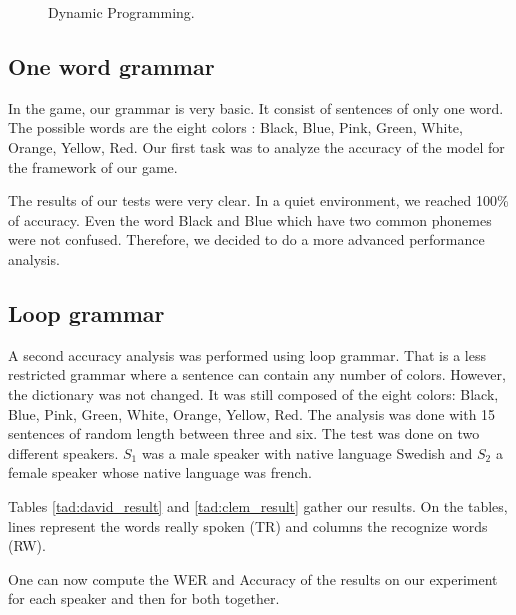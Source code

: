 \begin{figure}[h!]
\caption{Dynamic Programming. \cite{dyn_prog}}
\label{fig:dyn_prog}
\end{figure}

\subsection*{One word grammar}
In the game, our grammar is very basic. It consist of sentences of only one word. The possible words are the eight colors : Black, Blue, Pink, Green, White, Orange, Yellow, Red. Our first task was to analyze the accuracy of the model for the framework of our game. 

The results of our tests were very clear. In a quiet environment, we reached 100\% of accuracy. Even the word Black and Blue which have two common phonemes were not confused. Therefore, we decided to do a more advanced performance analysis.

\subsection*{Loop grammar}
A second accuracy analysis was performed using loop grammar. That is a less restricted grammar where a sentence can contain any number of colors. However, the dictionary was not changed. It was still composed of the eight colors: Black, Blue, Pink, Green, White, Orange, Yellow, Red. 
The analysis was done with 15 sentences of random length between three and six. The test was done on two different speakers. $S_1$ was a male speaker with native language Swedish and $S_2$ a female speaker whose native language was french. 

Tables \ref{tad:david_result} and \ref{tad:clem_result} gather our results. On the tables, lines represent the words really spoken (TR) and columns the recognize words (RW).

One can now compute the WER and Accuracy of the results on our experiment for each speaker and then for both together. 

